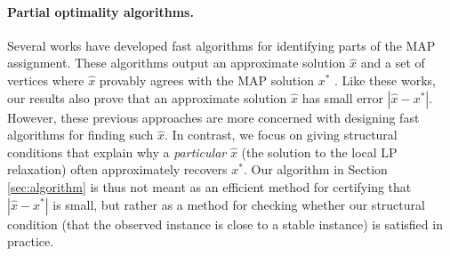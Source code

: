 \paragraph{Partial optimality algorithms.} Several works have developed fast algorithms for identifying parts of the MAP assignment. These algorithms output an approximate solution $\hat{x}$ and a set of vertices where $\hat{x}$ provably agrees with the MAP solution $x^*$ \citep[e.g.,][]{kovtun2003partial, shekhovtsov2013exact,swoboda2016partial,shekhovtsov2017maximum}. Like these works, our results also prove that an approximate solution $\hat{x}$ has small error $|\hat{x} - x^*|$. However, these previous approaches are more concerned with designing fast algorithms for finding such $\hat{x}$. In contrast, we focus on giving structural conditions that explain why a \emph{particular} $\hat{x}$ (the solution to the local LP relaxation) often approximately recovers $x^*$. Our algorithm in Section \ref{sec:algorithm} is thus not meant as an efficient method for certifying that $|\hat{x} - x^*|$ is small, but rather as a method for checking whether our structural condition (that the observed instance is close to a stable instance) is satisfied in practice.
